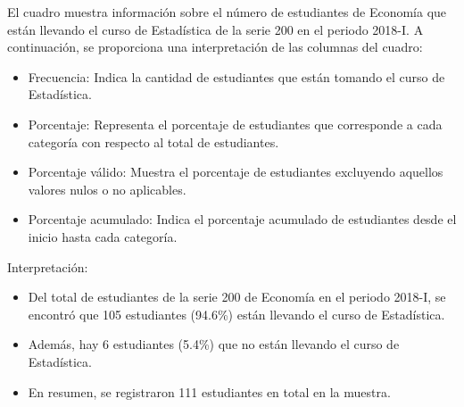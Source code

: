 \documentclass[
  a4paper,
]{article}
\providecommand{\tightlist}{%
  \setlength{\itemsep}{0pt}\setlength{\parskip}{0pt}}\usepackage{longtable,booktabs,array}
\begin{document}
El cuadro muestra información sobre el número de estudiantes de Economía
que están llevando el curso de Estadística de la serie 200 en el periodo
2018-I. A continuación, se proporciona una interpretación de las
columnas del cuadro:

\begin{itemize}
\tightlist
\item
  Frecuencia: Indica la cantidad de estudiantes que están tomando el
  curso de Estadística.
\item
  Porcentaje: Representa el porcentaje de estudiantes que corresponde a
  cada categoría con respecto al total de estudiantes.
\item
  Porcentaje válido: Muestra el porcentaje de estudiantes excluyendo
  aquellos valores nulos o no aplicables.
\item
  Porcentaje acumulado: Indica el porcentaje acumulado de estudiantes
  desde el inicio hasta cada categoría.
\end{itemize}

Interpretación:

\begin{itemize}
\tightlist
\item
  Del total de estudiantes de la serie 200 de Economía en el periodo
  2018-I, se encontró que 105 estudiantes (94.6\%) están llevando el
  curso de Estadística.
\item
  Además, hay 6 estudiantes (5.4\%) que no están llevando el curso de
  Estadística.
\item
  En resumen, se registraron 111 estudiantes en total en la muestra.
\end{itemize}
\end{document}
